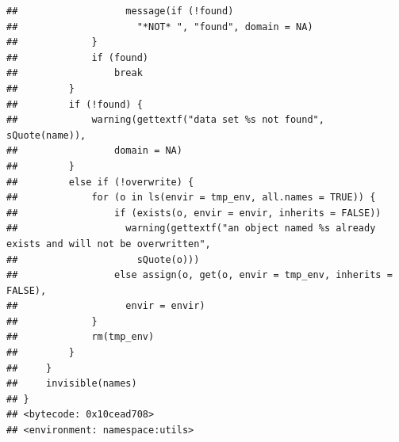 \documentclass[
]{article}
\begin{document}
\begin{verbatim}
##                   message(if (!found) 
##                     "*NOT* ", "found", domain = NA)
##             }
##             if (found) 
##                 break
##         }
##         if (!found) {
##             warning(gettextf("data set %s not found", sQuote(name)), 
##                 domain = NA)
##         }
##         else if (!overwrite) {
##             for (o in ls(envir = tmp_env, all.names = TRUE)) {
##                 if (exists(o, envir = envir, inherits = FALSE)) 
##                   warning(gettextf("an object named %s already exists and will not be overwritten", 
##                     sQuote(o)))
##                 else assign(o, get(o, envir = tmp_env, inherits = FALSE), 
##                   envir = envir)
##             }
##             rm(tmp_env)
##         }
##     }
##     invisible(names)
## }
## <bytecode: 0x10cead708>
## <environment: namespace:utils>
\end{verbatim}
\end{document}
